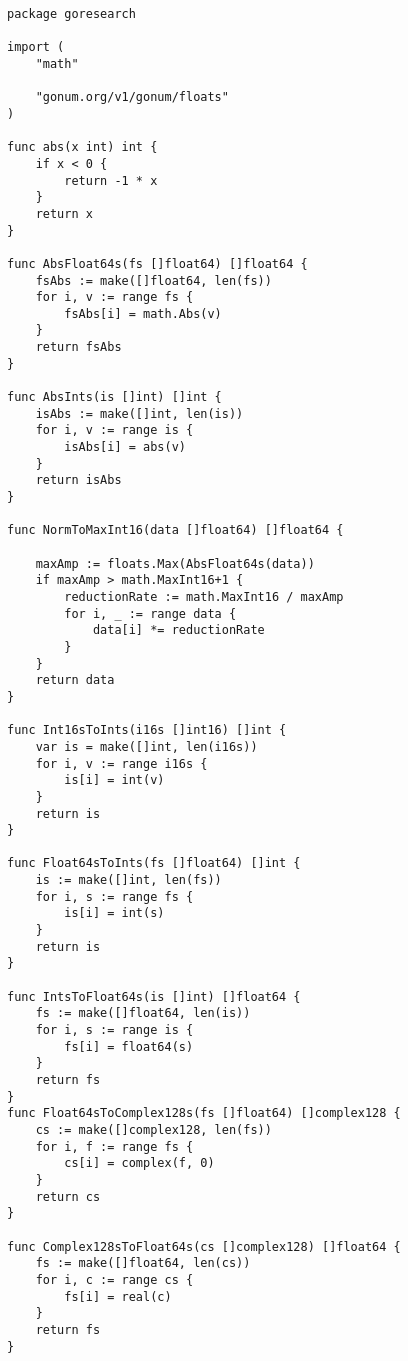 \begin{lstlisting}[caption=converter.go,label=converter.go]
package goresearch

import (
    "math"

    "gonum.org/v1/gonum/floats"
)

func abs(x int) int {
    if x < 0 {
        return -1 * x
    }
    return x
}

func AbsFloat64s(fs []float64) []float64 {
    fsAbs := make([]float64, len(fs))
    for i, v := range fs {
        fsAbs[i] = math.Abs(v)
    }
    return fsAbs
}

func AbsInts(is []int) []int {
    isAbs := make([]int, len(is))
    for i, v := range is {
        isAbs[i] = abs(v)
    }
    return isAbs
}

func NormToMaxInt16(data []float64) []float64 {

    maxAmp := floats.Max(AbsFloat64s(data))
    if maxAmp > math.MaxInt16+1 {
        reductionRate := math.MaxInt16 / maxAmp
        for i, _ := range data {
            data[i] *= reductionRate
        }
    }
    return data
}

func Int16sToInts(i16s []int16) []int {
    var is = make([]int, len(i16s))
    for i, v := range i16s {
        is[i] = int(v)
    }
    return is
}

func Float64sToInts(fs []float64) []int {
    is := make([]int, len(fs))
    for i, s := range fs {
        is[i] = int(s)
    }
    return is
}

func IntsToFloat64s(is []int) []float64 {
    fs := make([]float64, len(is))
    for i, s := range is {
        fs[i] = float64(s)
    }
    return fs
}
func Float64sToComplex128s(fs []float64) []complex128 {
    cs := make([]complex128, len(fs))
    for i, f := range fs {
        cs[i] = complex(f, 0)
    }
    return cs
}

func Complex128sToFloat64s(cs []complex128) []float64 {
    fs := make([]float64, len(cs))
    for i, c := range cs {
        fs[i] = real(c)
    }
    return fs
}
\end{lstlisting}


